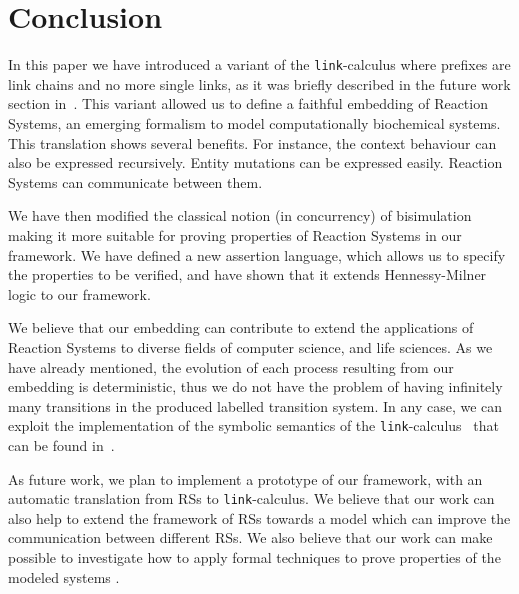 
\section{Conclusion}\label{sec:conclusion}

In this paper we have introduced a variant of the {\tt link}-calculus
where prefixes are link chains and no more single links, as it was 
briefly described in the future work section in~\cite{BBB17}.
This variant allowed us to define 
a faithful embedding of Reaction Systems,
an emerging formalism to model computationally biochemical systems.
This translation shows several benefits.
For instance, the context behaviour can also be expressed recursively. 
Entity mutations can be expressed easily. Reaction Systems can
communicate between them.

We have then modified the classical notion (in concurrency) of bisimulation
making it more suitable for proving properties of Reaction Systems in our
framework.
We have defined a new assertion language, which allows us to specify
the properties to be verified, and have shown that it extends Hennessy-Milner logic
to our framework.

We believe that our embedding can contribute to extend the applications
of Reaction Systems to diverse fields of computer science, and life
sciences.
As we have already mentioned, the evolution of each process resulting from our embedding 
is deterministic, thus we do not have the problem of having infinitely many transitions
in the produced labelled transition system. In any case, we can exploit the implementation of  the symbolic semantics of the {\tt link}-calculus~\cite{BrodoO17} that can be found in~\cite{tool}.


As future work, we plan to implement a prototype of our framework,
with an automatic translation from RSs to  {\tt link}-calculus. 
We believe that our work can also help to extend the framework
of RSs towards a model which can improve the communication
between different RSs. We also believe that our work can make 
possible to investigate how to apply formal techniques to prove 
properties of the
modeled systems \cite{CFHOT15,OCHF16,BBGLBH2017}.
